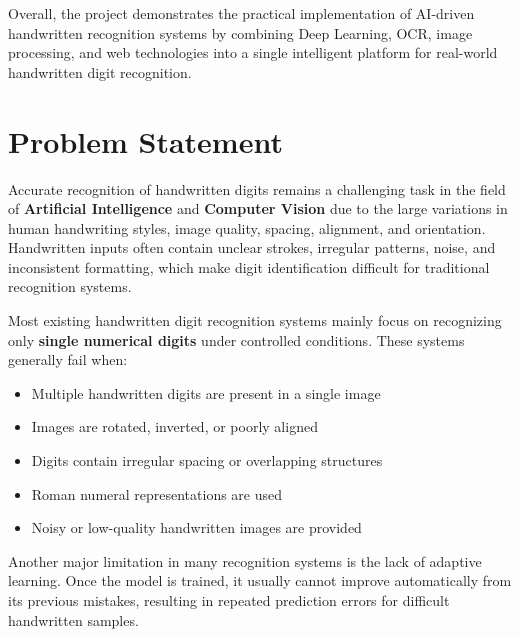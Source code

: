 \documentclass[12pt,a4paper]{article}
\begin{document}
\vspace{0.3cm}

\noindent
Overall, the project demonstrates the practical implementation of AI-driven handwritten recognition systems by combining Deep Learning, OCR, image processing, and web technologies into a single intelligent platform for real-world handwritten digit recognition.

\newpage

\section{Problem Statement}

\vspace{0.3cm}

\noindent
Accurate recognition of handwritten digits remains a challenging task in the field of \textbf{Artificial Intelligence} and \textbf{Computer Vision} due to the large variations in human handwriting styles, image quality, spacing, alignment, and orientation. Handwritten inputs often contain unclear strokes, irregular patterns, noise, and inconsistent formatting, which make digit identification difficult for traditional recognition systems.

\vspace{0.3cm}

\noindent
Most existing handwritten digit recognition systems mainly focus on recognizing only \textbf{single numerical digits} under controlled conditions. These systems generally fail when:
\begin{itemize}
\item Multiple handwritten digits are present in a single image
\item Images are rotated, inverted, or poorly aligned
\item Digits contain irregular spacing or overlapping structures
\item Roman numeral representations are used
\item Noisy or low-quality handwritten images are provided
\end{itemize}

\vspace{0.3cm}

\noindent
Another major limitation in many recognition systems is the lack of adaptive learning. Once the model is trained, it usually cannot improve automatically from its previous mistakes, resulting in repeated prediction errors for difficult handwritten samples.
\end{document}
